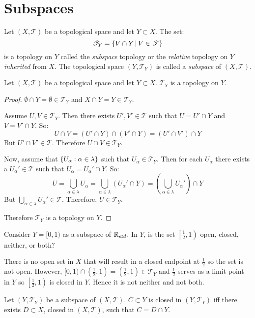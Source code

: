 \documentclass[letterpaper,12pt,fleqn]{article}
\newcommand{\T}{\mathscr{T}}
\renewcommand{\a}{\alpha}
\renewcommand{\l}{\lambda}
\begin{document}
\section*{Subspaces}

\begin{definition}[Subspace]
  Let \((X,\T)\) be a topological space and let \(Y\subset X\).  The set:
  \[\T_Y=\setb{V\cap Y}{V\in\T}\]
  is a topology on \(Y\) called the \emph{subspace} topology or the \emph{relative} topology on \(Y\)
  \emph{inherited} from \(X\).  The topological space \((Y,\T_Y)\) is called a \emph{subspace} of \((X,\T)\).
\end{definition}

\begin{theorem}
  Let \((X,\T)\) be a topological space and let \(Y\subset X\).  \(\T_Y\) is a topology on \(Y\).
\end{theorem}

\begin{proof}
  \(\emptyset\cap Y=\emptyset\in\T_Y\) and \(X\cap Y=Y\in\T_Y\).

  Assume \(U,V\in\T_Y\).  Then there exists \(U',V'\in\T\) such that \(U=U'\cap Y\) and \(V=V'\cap Y\).  So:
  \[U\cap V=(U'\cap Y)\cap(V'\cap Y)=(U'\cap V')\cap Y\]
  But \(U'\cap V'\in\T\).  Therefore \(U\cap V\in\T_Y\).

  Now, assume that \(\set{U_{\a}:\a\in\l}\) such that \(U_{\a}\in\T_Y\).  Then for each \(U_{\a}\) there exists a
  \(U_{\a}'\in\T\) such that \(U_{\a}=U_{\a}'\cap Y\).  So:
  \[U=\bigcup_{\a\in\l}U_{\a}=\bigcup_{\a\in\l}(U_{\a}'\cap Y)=\left(\bigcup_{\a\in\l}U_{\a}'\right)\cap Y\]
  But \(\bigcup_{\a\in\l}U_{\a}'\in\T\).  Therefore, \(U\in\T_Y\).

  Therefore \(\T_Y\) is a topology on \(Y\).
\end{proof}

\begin{example}
  Consider \(Y=[0,1)\) as a subspace of \(\mathbb{R}_{std}\).  In \(Y\), is the set \(\left[\frac{1}{2},1\right)\) open,
  closed, neither, or both?

  There is no open set in \(X\) that will result in a closed endpoint at \(\frac{1}{2}\) so the set is not open.
  However, \([0,1)\cap\left(\frac{1}{2},1\right)=\left(\frac{1}{2},1\right)\in\T_Y\) and \(\frac{1}{2}\) serves as
  a limit point in \(Y\) so \(\left[\frac{1}{2},1\right)\) is closed in \(Y\).  Hence it is not neither and not
  both.
\end{example}

\begin{theorem}
  Let \((Y,\T_Y)\) be a subspace of \((X,\T)\).  \(C\subset Y\) is closed in \((Y,\T_Y)\) iff there exists
  \(D\subset X\), closed in \((X,\T)\), such that \(C=D\cap Y\).
\end{theorem}
\end{document}
